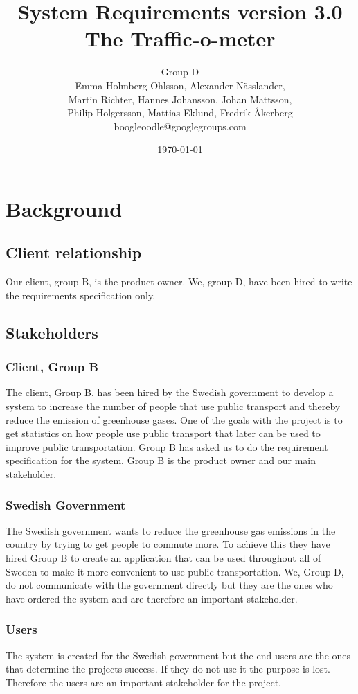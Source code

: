 \documentclass[a4paper]{article}
\title{System Requirements version 3.0\\ The Traffic-o-meter}
\author{Group D\\ Emma Holmberg Ohlsson, Alexander Nässlander,\\Martin Richter, Hannes Johansson, Johan Mattsson,\\Philip Holgersson, Mattias Eklund, Fredrik Åkerberg\\boogleoodle@googlegroups.com}
\date{\today}
\begin{document}
	\maketitle
	\thispagestyle{empty}
	\setcounter{page}{0}
	\pagebreak
	\tableofcontents
	\thispagestyle{empty}
	\pagebreak
	



	\section{Background} %
	\label{sec:background}
	
		\subsection{Client relationship}
	Our client, group B, is the product owner. We, group D, have been hired to write the requirements specification only.
		\subsection{Stakeholders} %
		\label{sub:stakeholders}
			\subsubsection{Client, Group B}
			The client, Group B, has been hired by the Swedish government to develop a system to increase the number of people that use public transport and thereby reduce the emission of greenhouse gases. One of the goals with the project is to get statistics on how people use public transport that later can be used to improve public transportation. Group B has asked us to do the requirement specification for the system. Group B is the product owner and our main stakeholder.

			\subsubsection{Swedish Government}
			The Swedish government wants to reduce the greenhouse gas emissions in the country by trying to get people to commute more. To achieve this they have hired Group B to create an application that can be used throughout all of Sweden to make it more convenient to use public transportation. We, Group D, do not  communicate with the government directly but they are the ones who have ordered the system and are therefore an important stakeholder. 

			\subsubsection{Users}
			The system is created for the Swedish government but the end users are the ones that determine the projects success. If they do not use it the purpose is lost. Therefore the users are an important stakeholder for the project.
\end{document}
